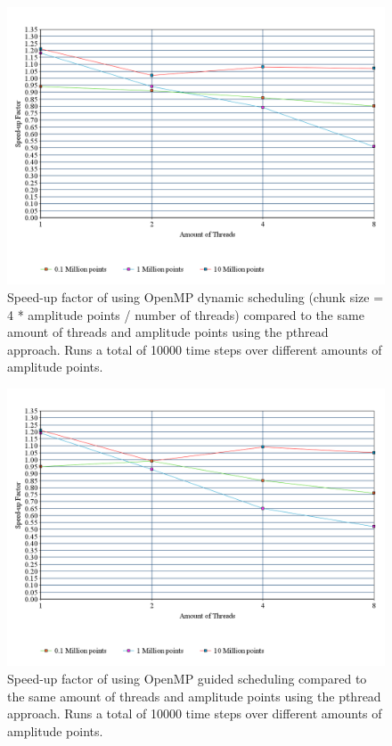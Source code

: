 \documentclass[a4paper,12px]{article}
\begin{document}
\begin{figure}[H]
    \centering
    \includegraphics[width=\textwidth]{dynamic}
    \caption{Speed-up factor of using OpenMP dynamic scheduling (chunk size
        = 4 * amplitude points / number of threads) compared to the same amount of
    threads and amplitude points using the pthread approach. Runs a total of
    10000 time steps over different amounts of amplitude points.}
\end{figure}

\begin{figure}[H]
    \centering
    \includegraphics[width=\textwidth]{guided}
    \caption{Speed-up factor of using OpenMP guided scheduling compared to the
    same amount of threads and amplitude points using the pthread approach. Runs
    a total of 10000 time steps over different amounts of amplitude points.}
\end{figure}
\end{document}
